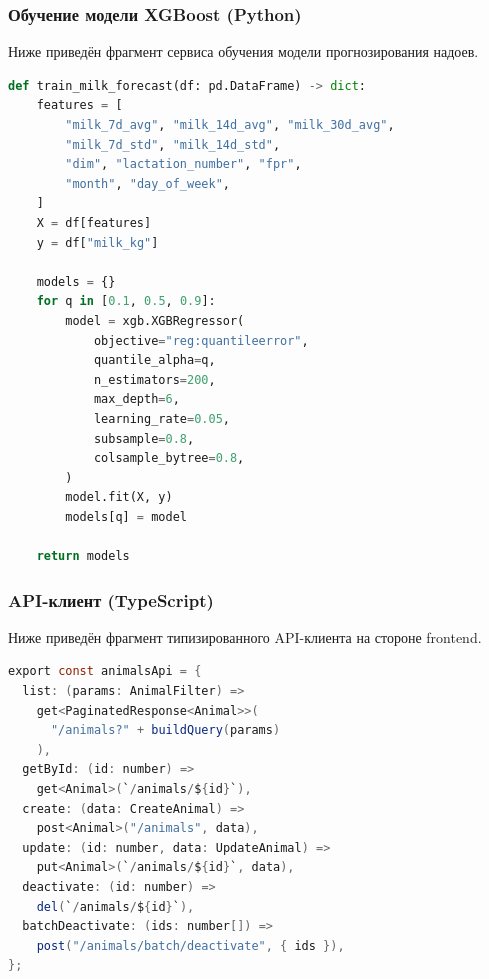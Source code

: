 \subsubsection{Обучение модели XGBoost (Python)}

Ниже приведён фрагмент сервиса обучения модели прогнозирования надоев.

\begin{lstlisting}[language=Python,basicstyle=\small\ttfamily]
def train_milk_forecast(df: pd.DataFrame) -> dict:
    features = [
        "milk_7d_avg", "milk_14d_avg", "milk_30d_avg",
        "milk_7d_std", "milk_14d_std",
        "dim", "lactation_number", "fpr",
        "month", "day_of_week",
    ]
    X = df[features]
    y = df["milk_kg"]

    models = {}
    for q in [0.1, 0.5, 0.9]:
        model = xgb.XGBRegressor(
            objective="reg:quantileerror",
            quantile_alpha=q,
            n_estimators=200,
            max_depth=6,
            learning_rate=0.05,
            subsample=0.8,
            colsample_bytree=0.8,
        )
        model.fit(X, y)
        models[q] = model

    return models
\end{lstlisting}

\subsubsection{API-клиент (TypeScript)}

Ниже приведён фрагмент типизированного API-клиента на стороне frontend.

\begin{lstlisting}[language=Java,basicstyle=\small\ttfamily]
export const animalsApi = {
  list: (params: AnimalFilter) =>
    get<PaginatedResponse<Animal>>(
      "/animals?" + buildQuery(params)
    ),
  getById: (id: number) =>
    get<Animal>(`/animals/${id}`),
  create: (data: CreateAnimal) =>
    post<Animal>("/animals", data),
  update: (id: number, data: UpdateAnimal) =>
    put<Animal>(`/animals/${id}`, data),
  deactivate: (id: number) =>
    del(`/animals/${id}`),
  batchDeactivate: (ids: number[]) =>
    post("/animals/batch/deactivate", { ids }),
};
\end{lstlisting}
